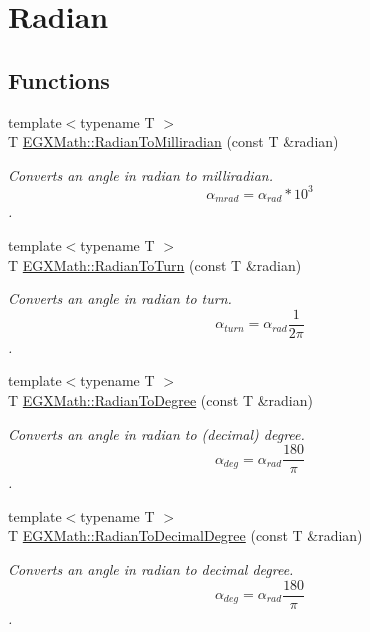 \hypertarget{group___e_g_x_math-_angle_conversions-_radian}{}\section{Radian}
\label{group___e_g_x_math-_angle_conversions-_radian}
\subsection*{Functions}
\begin{DoxyCompactItemize}
\item 
{\footnotesize template$<$typename T $>$ }\\T \mbox{\hyperlink{group___e_g_x_math-_angle_conversions-_radian_gaea391f0cca39b05e298dd1cae162e7f1}{E\+G\+X\+Math\+::\+Radian\+To\+Milliradian}} (const T \&radian)
\begin{DoxyCompactList}\small\item\em Converts an angle in radian to milliradian. \[\alpha_{mrad}=\alpha_{rad}*10^3\]. \end{DoxyCompactList}\item 
{\footnotesize template$<$typename T $>$ }\\T \mbox{\hyperlink{group___e_g_x_math-_angle_conversions-_radian_ga8492d6d2f6467c619b65e5fb75a9ae04}{E\+G\+X\+Math\+::\+Radian\+To\+Turn}} (const T \&radian)
\begin{DoxyCompactList}\small\item\em Converts an angle in radian to turn. \[\alpha_{turn}=\alpha_{rad}\frac{1}{2 \pi}\]. \end{DoxyCompactList}\item 
{\footnotesize template$<$typename T $>$ }\\T \mbox{\hyperlink{group___e_g_x_math-_angle_conversions-_radian_ga25bbce6cdc1c3621f2a158d320e3bc45}{E\+G\+X\+Math\+::\+Radian\+To\+Degree}} (const T \&radian)
\begin{DoxyCompactList}\small\item\em Converts an angle in radian to (decimal) degree. \[\alpha_{deg}=\alpha_{rad}\frac{180}{\pi}\]. \end{DoxyCompactList}\item 
{\footnotesize template$<$typename T $>$ }\\T \mbox{\hyperlink{group___e_g_x_math-_angle_conversions-_radian_ga6d170f1882c32de53167c04524d05f67}{E\+G\+X\+Math\+::\+Radian\+To\+Decimal\+Degree}} (const T \&radian)
\begin{DoxyCompactList}\small\item\em Converts an angle in radian to decimal degree. \[\alpha_{deg}=\alpha_{rad}\frac{180}{\pi}\]. \end{DoxyCompactList}\item 

\end{DoxyCompactItemize}
